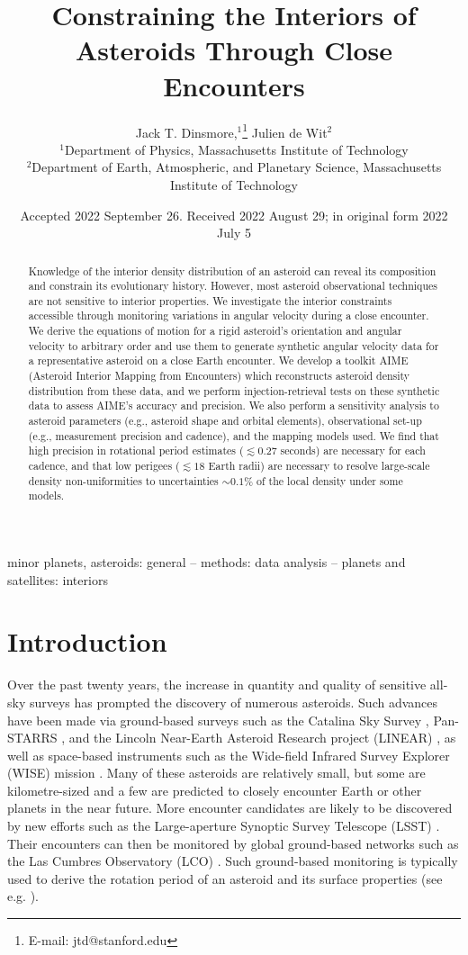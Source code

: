 \documentclass[fleqn,usenatbib]{mnras}
\title[Flyby Constraints on Asteroids Interiors]{Constraining the Interiors of Asteroids Through Close Encounters}
\author[Jack T. Dinsmore, Julien de Wit]{
Jack T. Dinsmore,$^{1}$\thanks{E-mail: jtd@stanford.edu}
Julien de Wit$^{2}$
\\
$^{1}$Department of Physics, Massachusetts Institute of Technology\\
$^{2}$Department of Earth, Atmospheric, and Planetary Science, Massachusetts Institute of Technology
}
\date{Accepted 2022 September 26. Received 2022 August 29; in original form 2022 July 5}
\begin{document}
\label{firstpage}
\pagerange{\pageref{firstpage}--\pageref{lastpage}}
\maketitle

\begin{abstract}
  Knowledge of the interior density distribution of an asteroid can reveal its composition and constrain its evolutionary history. However, most asteroid observational techniques are not sensitive to interior properties. We investigate the interior constraints accessible through monitoring variations in angular velocity during a close encounter. We derive the equations of motion for a rigid asteroid's orientation and angular velocity to arbitrary order and use them to generate synthetic angular velocity data for a representative asteroid on a close Earth encounter. We develop a toolkit AIME (Asteroid Interior Mapping from Encounters) which reconstructs asteroid density distribution from these data, and we perform injection-retrieval tests on these synthetic data to assess AIME's accuracy and precision. We also perform a sensitivity analysis to asteroid parameters (e.g., asteroid shape and orbital elements), observational set-up (e.g., measurement precision and cadence), and the mapping models used. We find that high precision in rotational period estimates ($\lesssim 0.27$ seconds) are necessary for each cadence, and that low perigees ($\lesssim 18$ Earth radii) are necessary to resolve large-scale density non-uniformities to uncertainties $\sim 0.1\%$ of the local density under some models.
\end{abstract}

\begin{keywords}
  minor planets, asteroids: general -- methods: data analysis -- planets and satellites: interiors
\end{keywords}


\section{Introduction}

Over the past twenty years, the increase in quantity and quality of sensitive all-sky surveys has prompted the discovery of numerous asteroids. Such advances have been made via ground-based surveys such as the Catalina Sky Survey \citep{larson1998catalina}, Pan-STARRS \citep{kaiser2002pan}, and the Lincoln Near-Earth Asteroid Research project (LINEAR) \citep{stokes2000lincoln}, as well as space-based instruments such as the Wide-field Infrared Survey Explorer (WISE) mission \citep{wright2010wide}. Many of these asteroids are relatively small, but some are kilometre-sized and a few are predicted to closely encounter Earth or other planets in the near future. More encounter candidates are likely to be discovered by new efforts such as the Large-aperture Synoptic Survey Telescope (LSST) \citep{tyson2002large}. Their encounters can then be monitored by global ground-based networks such as the Las Cumbres Observatory (LCO) \citep{brown2013cumbres}. Such ground-based monitoring is typically used to derive the rotation period of an asteroid and its surface properties (see e.g. \cite{10.1093/mnras/stab1252}).
\end{document}
